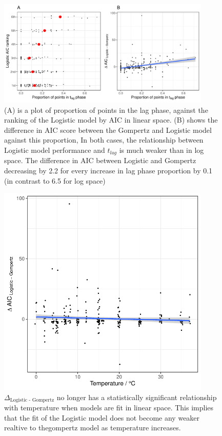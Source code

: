 \documentclass[11pt, a4paper]{article}
\begin{document}
        
                        \begin{figure}[H]
        \includegraphics[width=4in]{../results/tlag_vs_logistic_linear.pdf}
        \centering
        \caption{(A) is a plot of proportion of points in the lag phase, against the ranking of the Logistic model by AIC in linear space. (B) shows the difference in AIC score between the Gompertz and Logistic model against this proportion, In both cases, the relationship between Logistic model performance and $t_{lag}$ is much weaker than in log space. The difference in AIC between Logistic and Gompertz decreasing by 2.2 for every increase in lag phase proportion by 0.1 (in contrast to 6.5 for log space)}
        \label{sup:tlag_logistic_linear}
        \end{figure} 
        
                                \begin{figure}[H]
        \includegraphics[width=4in]{../results/logistic_vs_gompertz_temp_linear.pdf}
        \centering
        \caption{$\Delta_{\text{Logistic - Gompertz}}$ no longer has a statistically significant relationship with temperature when models are fit in linear space. This implies that the fit of the Logistic model does not become any weaker realtive to thegompertz model as temperature increases.}
        \label{sup:logistic_temp_linear}
        \end{figure} 
        
\end{document}
